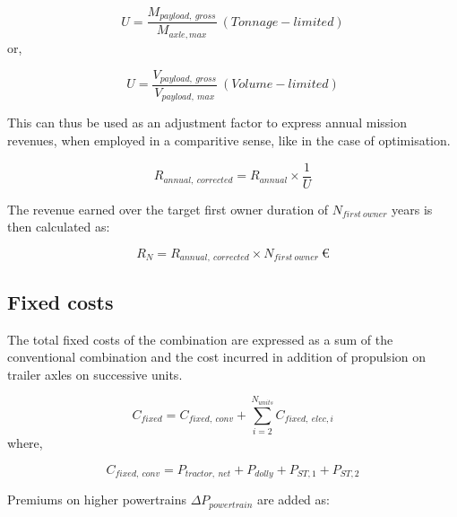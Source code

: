 \documentclass[ExampleMasters.tex]{subfiles}
\begin{document}
		\begin{equation}
			U = \frac{M_{payload,\ gross}}{M_{axle,max}}\ (Tonnage-limited)
		\end{equation}
		or,

		\begin{equation}
			U = \frac{V_{payload,\ gross}}{V_{payload,\ max}}\ (Volume-limited)
		\end{equation}

		This can thus be used as an adjustment factor to express annual mission revenues, when employed in a comparitive sense, like in the case of optimisation.

		\begin{equation}
			R_{annual,\ corrected} = R_{annual} \times \frac{1}{U}
		\end{equation}

		 The revenue earned over the target first owner duration of $N_{first\ owner}$ years is then calculated as:

		\begin{equation}
			R_{N} = R_{annual,\ corrected} \times N_{first\ owner} \  \euro
		\end{equation}

		\subsection{Fixed costs}

			The total fixed costs of the combination are expressed as a sum of the conventional combination and the cost incurred in addition of propulsion on trailer axles on successive units.

			\begin{equation}
				C_{fixed} = C_{fixed,\ conv}+ \displaystyle \sum_{i=2}^{N_{units}} C_{fixed,\ elec, i}
			\end{equation}
			   where, 

			\begin{equation}
				C_{fixed,\ conv} = P_{tractor,\ net}+P_{dolly}+P_{ST,1}+P_{ST,2}
			\end{equation}

			   Premiums on higher powertrains $\Delta P_{powertrain}$  are added as:
			
\end{document}
